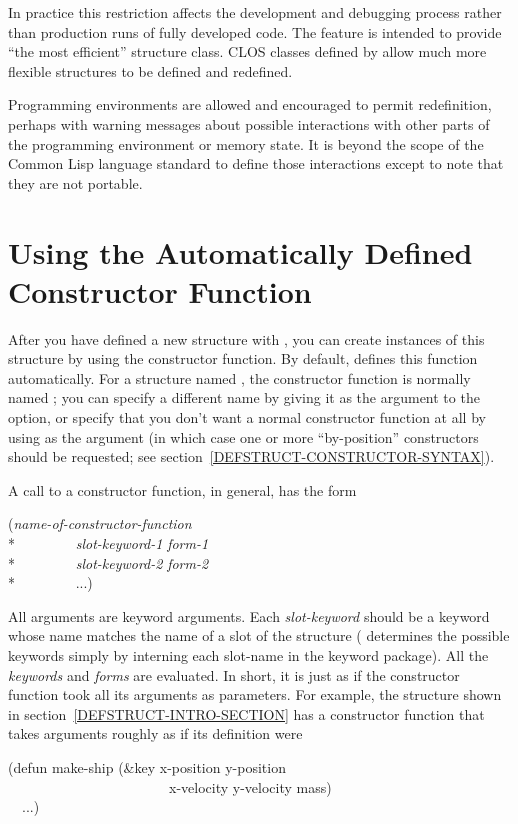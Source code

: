 \begin{defmac}
\begin{newer}
In practice this restriction affects the development
and debugging process rather than production runs of fully developed code.
The  feature is intended to provide
``the most efficient'' structure class.
CLOS classes defined by 
allow much more flexible structures to be defined and redefined.

Programming environments are allowed and encouraged to permit 
redefinition, perhaps with warning messages about possible interactions
with other parts of the programming environment or memory state.
It is beyond the scope of the Common Lisp
language standard to define those interactions except to note that they
are not portable.
\end{newer}
\end{defmac}

\section{Using the Automatically Defined Constructor Function}

After you have defined a new structure with , you can
create instances of this structure by using the constructor function.
By default,  defines this function automatically.
For a structure named , the constructor function is normally
named ;
you can specify a different name
by giving it as the argument to the
 option, or specify that you don't
want a normal
constructor function at all by using {\false} as the argument
(in which case one or more ``by-position'' constructors should be
requested; see section~\ref{DEFSTRUCT-CONSTRUCTOR-SYNTAX}).

A call to a constructor function, in general, has the form
\begin{lisp}
(\emph{name-of-constructor-function} \\*
~~~~~~~~\emph{slot-keyword-1} \emph{form-1} \\*
~~~~~~~~\emph{slot-keyword-2} \emph{form-2} \\*
~~~~~~~~...)
\end{lisp}
All arguments are keyword arguments.  Each \emph{slot-keyword} should be a
keyword whose name matches the name of a slot of the structure
( determines the possible keywords simply by interning each
slot-name in the keyword package).  All the \emph{keywords} and \emph{forms}
are evaluated.  In short, it is just as if the constructor function
took all its arguments as  parameters.  For example, the
 structure shown in section~\ref{DEFSTRUCT-INTRO-SECTION}
has a constructor function that takes arguments roughly as if its definition
were
\begin{lisp}
(defun make-ship (\&key x-position y-position \\
~~~~~~~~~~~~~~~~~~~~~~~x-velocity y-velocity mass) \\
~~...)
\end{lisp}

